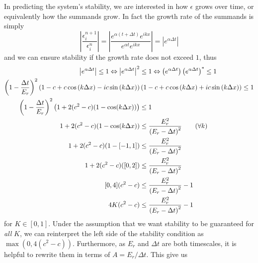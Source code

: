 \documentclass[11pt]{article}
\begin{document}
In predicting the system's stability, we are interested in how $\epsilon$ grows over time, or equivalently how the summands grow. In fact the growth rate of the summands is simply
\[
\left|\frac{\epsilon^{n+1}_i}{\epsilon^n_i}\right| = \left|\frac{e^{\alpha\left(t+\Delta t\right)}e^{ikx}}{e^{\alpha t}e^{ikx}}\right| = \left|e^{\alpha\Delta t}\right|
\]
and we can ensure stability if the growth rate does not exceed $1$, thus
\begin{align}
\left|e^{\alpha\Delta t}\right|\leq 1 \Leftrightarrow
\left|e^{\alpha\Delta t}\right|^2&\leq 1 \Leftrightarrow
\left(e^{\alpha\Delta t}\right)\left(e^{\alpha\Delta t}\right)^*\leq 1 \nonumber\\
\left(1-\frac{\Delta t}{E_r}\right)^2
\left(1-c+c\cos\left(k\Delta x\right)-ic\sin\left(k\Delta x\right)\right) &
\left(1-c+c\cos\left(k\Delta x\right)+ic\sin\left(k\Delta x\right)\right)\leq 1 \nonumber\\
\left(1-\frac{\Delta t}{E_r}\right)^2\left(1+2(c^2-c)(1-\cos(k\Delta x))\right) &\leq 1 \nonumber\\
1+2(c^2-c)(1-\cos(k\Delta x)) &\leq \frac{E_r^2}{\left(E_r-\Delta t\right)^2}		\text{\quad\quad($\forall k$)} \nonumber\\
1+2(c^2-c)(1-[-1,1]) &\leq \frac{E_r^2}{\left(E_r-\Delta t\right)^2} \nonumber\\
1+2(c^2-c)([0,2]) &\leq \frac{E_r^2}{\left(E_r-\Delta t\right)^2} \nonumber\\
[0,4](c^2-c)	&\leq \frac{E_r^2}{\left(E_r-\Delta t\right)^2}-1 \nonumber \\
4K(c^2-c) &\leq \frac{E_r^2}{\left(E_r-\Delta t\right)^2}-1		\label{eq:stable}
\end{align}
for $K\in[0,1]$. Under the assumption that we want stability to be guaranteed for \emph{all} $K$, we can reinterpret the left side of the stability condition as $\max\left(0,4(c^2-c)\right)$. Furthermore, as $E_r$ and $\Delta t$ are both timescales, it is helpful to rewrite them in terms of $A=E_r/\Delta t$. This give us
\end{document}
